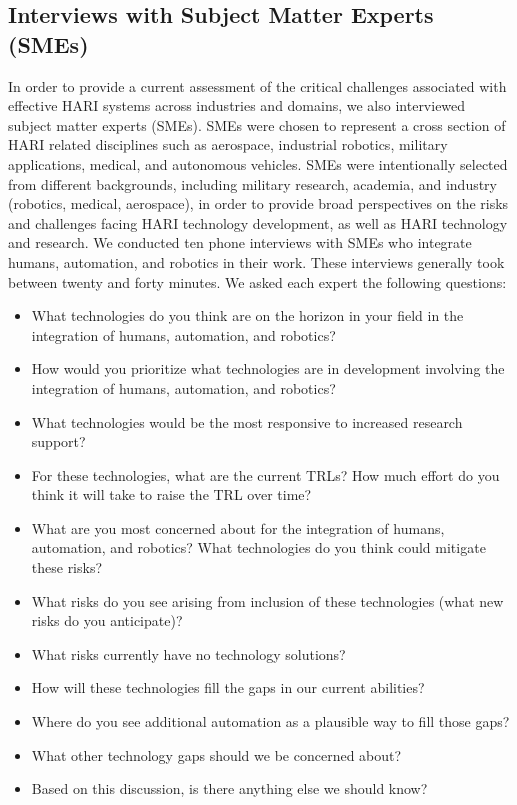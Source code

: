 \subsection{Interviews with Subject Matter Experts (SMEs)}
In order to provide a current assessment of the critical challenges associated with effective HARI systems across industries and domains, we also interviewed subject matter experts (SMEs).
SMEs were chosen to represent a cross section of HARI related disciplines such as aerospace, industrial robotics, military applications, medical, and autonomous vehicles.
SMEs were intentionally selected from different backgrounds, including military research, academia, and industry (robotics, medical, aerospace), in order to provide broad perspectives on the risks and challenges facing HARI technology development, as well as HARI technology and research.
We conducted ten phone interviews with SMEs who integrate humans, automation, and robotics in their work.
These interviews generally took between twenty and forty minutes.
We asked each expert the following questions:
\begin{itemize}
    \item What technologies do you think are on the horizon in your field in the integration of humans, automation, and robotics?
    \item How would you prioritize what technologies are in development involving the integration of humans, automation, and robotics?
    \item What technologies would be the most responsive to increased research support?
    \item For these technologies, what are the current TRLs? How much effort do you think it will take to raise the TRL over time?
    \item What are you most concerned about for the integration of humans, automation, and robotics? What technologies do you think could mitigate these risks?
    \item What risks do you see arising from inclusion of these technologies (what new risks do you anticipate)?
    \item What risks currently have no technology solutions?
    \item How will these technologies fill the gaps in our current abilities?
    \item Where do you see additional automation as a plausible way to fill those gaps?
    \item What other technology gaps should we be concerned about?
    \item Based on this discussion, is there anything else we should know?
\end{itemize}

